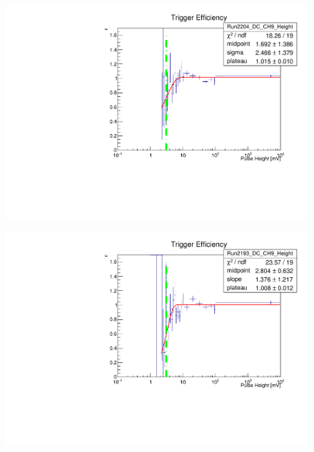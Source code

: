 \documentclass[12pt]{article}
\begin{document}
\begin{figure}[b!]
\centering
\begin{minipage}{.53\textwidth}
  \centering
  \includegraphics[width=1.\linewidth]{figures/triggerEfficiency/Efficiency_Run2204_DC_CH9_Height_vs_Run2202_SC_CH9_Height}
  \label{fig:rate1}
\end{minipage}%
\begin{minipage}{.53\textwidth}
  \centering
  \includegraphics[width=1.\linewidth]{figures/triggerEfficiency/Efficiency_Run2193_DC_CH9_Height_vs_Run2191_SC_CH9_Height}
  \label{fig:rate2}
\end{minipage}


\end{figure}
\end{document}
